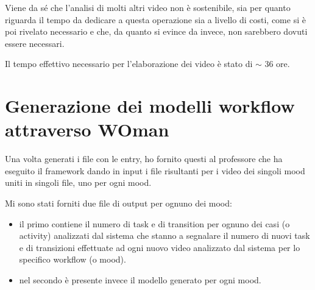 Viene da sé che l’analisi di molti altri video non è sostenibile, sia per quanto riguarda il tempo da dedicare a questa operazione sia a livello di costi, come si è poi rivelato necessario e che, da quanto si evince da \cite{WoMan} invece, non sarebbero dovuti essere necessari. 

Il tempo effettivo necessario per l'elaborazione dei video è stato di $\sim$ 36 ore.

\section{Generazione dei modelli workflow attraverso WOman}
Una volta generati i file con le entry, ho fornito questi al professore che ha eseguito il framework dando in input i file risultanti per i video dei singoli mood uniti in singoli file, uno per ogni mood.

Mi sono stati forniti due file di output per ognuno dei mood:
\begin{itemize}
\item il primo contiene il numero di task e di transition per ognuno dei casi (o activity) analizzati dal sistema che stanno a segnalare il numero di nuovi task e di transizioni effettuate ad ogni nuovo video analizzato dal sistema per lo specifico workflow (o mood).
\item nel secondo è presente invece il modello generato per ogni mood.
\end{itemize}

